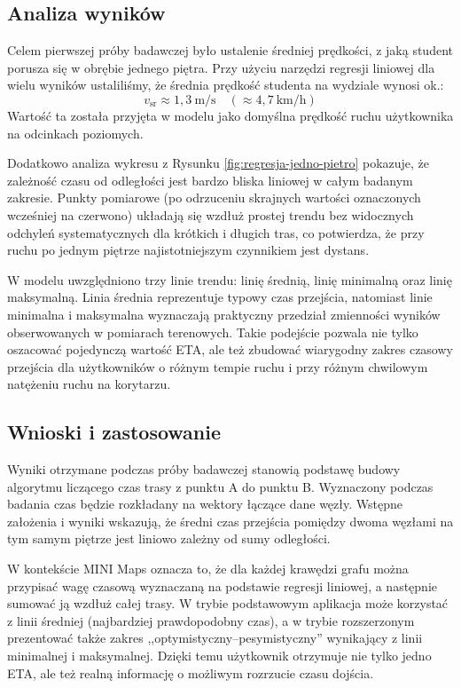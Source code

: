 \documentclass[14pt,a4paper]{extarticle}
\begin{document}
\subsection{Analiza wyników}
Celem pierwszej próby badawczej było ustalenie średniej prędkości, z jaką student porusza się w obrębie jednego piętra. Przy użyciu narzędzi regresji liniowej dla wielu wyników ustaliliśmy, że średnia prędkość studenta na wydziale wynosi ok.:
\begin{equation}
    v_{\text{sr}} \approx 1{,}3\ \text{m/s} \quad (\approx 4{,}7\ \text{km/h})
\end{equation}
Wartość ta została przyjęta w modelu jako domyślna prędkość ruchu użytkownika na odcinkach poziomych.

Dodatkowo analiza wykresu z Rysunku \ref{fig:regresja-jedno-pietro} pokazuje, że zależność czasu od odległości jest bardzo bliska liniowej w całym badanym zakresie. Punkty pomiarowe (po odrzuceniu skrajnych wartości oznaczonych wcześniej na czerwono) układają się wzdłuż prostej trendu bez widocznych odchyleń systematycznych dla krótkich i długich tras, co potwierdza, że przy ruchu po jednym piętrze najistotniejszym czynnikiem jest dystans.

W modelu uwzględniono trzy linie trendu: linię średnią, linię minimalną oraz linię maksymalną. Linia średnia reprezentuje typowy czas przejścia, natomiast linie minimalna i maksymalna wyznaczają praktyczny przedział zmienności wyników obserwowanych w pomiarach terenowych. Takie podejście pozwala nie tylko oszacować pojedynczą wartość ETA, ale też zbudować wiarygodny zakres czasowy przejścia dla użytkowników o różnym tempie ruchu i przy różnym chwilowym natężeniu ruchu na korytarzu.

\subsection{Wnioski i zastosowanie}
Wyniki otrzymane podczas próby badawczej stanowią podstawę budowy algorytmu liczącego czas trasy z punktu A do punktu B. Wyznaczony podczas badania czas będzie rozkładany na wektory łączące dane węzły. Wstępne założenia i wyniki wskazują, że średni czas przejścia pomiędzy dwoma węzłami na tym samym piętrze jest liniowo zależny od sumy odległości.

W kontekście MINI Maps oznacza to, że dla każdej krawędzi grafu można przypisać wagę czasową wyznaczaną na podstawie regresji liniowej, a następnie sumować ją wzdłuż całej trasy. W trybie podstawowym aplikacja może korzystać z linii średniej (najbardziej prawdopodobny czas), a w trybie rozszerzonym prezentować także zakres ,,optymistyczny--pesymistyczny'' wynikający z linii minimalnej i maksymalnej. Dzięki temu użytkownik otrzymuje nie tylko jedno ETA, ale też realną informację o możliwym rozrzucie czasu dojścia.
\end{document}
